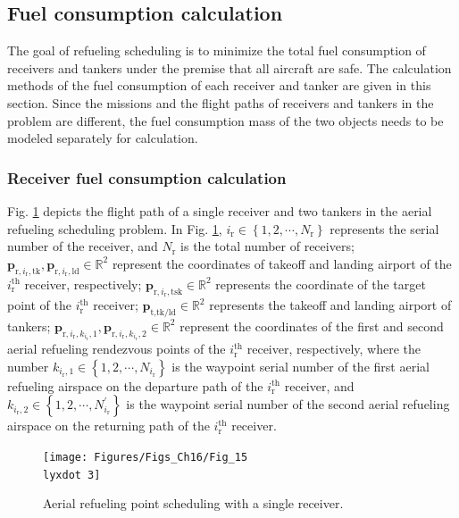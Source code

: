 \subsection{Fuel consumption calculation}
The goal of refueling scheduling is to minimize the total fuel consumption of receivers and tankers under the premise that all aircraft are safe. The calculation methods of the fuel consumption of each receiver and tanker are given in this section. Since the missions and the flight paths of receivers and tankers in the problem are different, the fuel consumption mass of the two objects needs to be modeled separately for calculation.


\subsubsection{Receiver fuel consumption calculation}
Fig. \ref{Fig_15.3} depicts the flight path of a single receiver and two tankers in the aerial refueling scheduling problem. In Fig. \ref{Fig_15.3}, $i_\text{r}\in\left\{1,2,\cdots,N_\text{r}\right\}$ represents the serial number of the receiver, and  $N_\text{r}$ is the total number of receivers; $\mathbf{p}_{\text{r},i_\text{r},\text{tk}},\mathbf{p}_{\text{r},i_\text{r},\text{ld}}\in\mathbb{R}^2$  represent the coordinates of takeoff and landing airport of the $i_{\text{r}}^{\text{th}}$  receiver, respectively; $\mathbf{p}_{\text{r},i_\text{r},\text{tsk}}\in\mathbb{R}^2$  represents the coordinate of the target point of the $i_{\text{r}}^{\text{th}}$ receiver; $\mathbf{p}_{\text{t},\text{tk/ld}}\in\mathbb{R}^2$  represents the takeoff and landing airport of tankers; $\mathbf{p}_{\text{r},i_{\text{r}},k_{i_{\text{r}}},1},\mathbf{p}_{\text{r},i_{\text{r}},k_{i_{\text{r}}},2}\in\mathbb{R}^{2}$  represent the coordinates of the first and second aerial refueling rendezvous points of the $i_{\text{r}}^{\text{th}}$  receiver, respectively, where the number  $k_{{i_\text{r}},1}\in\left\{1,2,\cdots,N_{i_\text{r}}\right\}$ is the waypoint serial number of the first aerial refueling airspace on the departure path of the $i_{\text{r}}^{\text{th}}$  receiver, and  $k_{{i_\text{r}},2}\in\left\{1,2,\cdots,N_{i_\text{r}}^{'}\right\}$ is the waypoint serial number of the second aerial refueling airspace on the returning path of the $i_{\text{r}}^{\text{th}}$  receiver. 

\begin{figure}
	\begin{centering}
		\texttt{[image: Figures/Figs\_Ch16/Fig\_15\\lyxdot 3]}
		\par\end{centering}
	\caption{Aerial refueling point scheduling with a single receiver.}
	\centering{}\label{Fig_15.3}
\end{figure}

